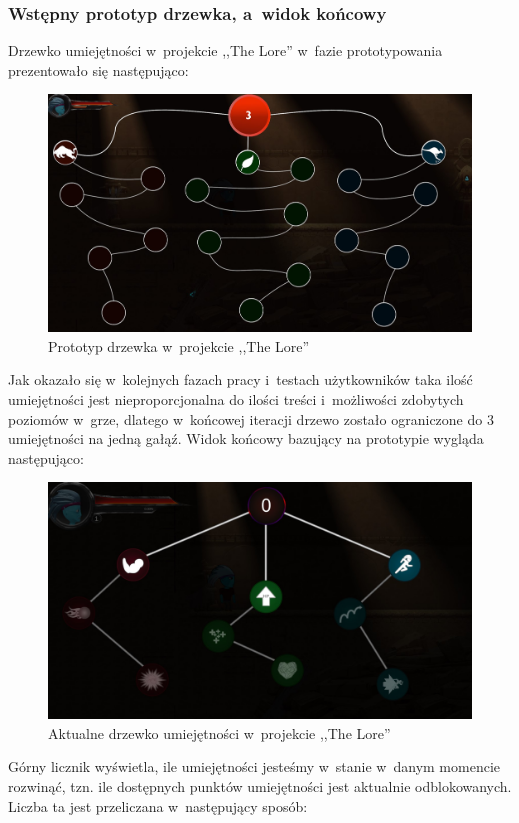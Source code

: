 \documentclass[oneside,polski,logo]{amuthesis}
\begin{document}
\subsubsection{Wstępny prototyp drzewka, a~widok końcowy}
Drzewko umiejętności w~projekcie ,,The Lore'' w~fazie prototypowania prezentowało się następująco:


\begin{figure}[h]
	\centering
	\includegraphics[width=13cm]{images/kozubal/drzewkoPrototyp.jpg}
	\caption{Prototyp drzewka w~projekcie ,,The Lore''}
\end{figure}

Jak okazało się w~kolejnych fazach pracy i~testach użytkowników taka ilość umiejętności jest nieproporcjonalna do ilości treści i~możliwości zdobytych poziomów w~grze, dlatego w~końcowej iteracji drzewo zostało ograniczone do 3 umiejętności na jedną gałąź. Widok końcowy bazujący na prototypie wygląda następująco:


\begin{figure}[h]
	\centering
	\includegraphics[width=13cm]{images/kozubal/drzewkoTheLore.jpg}
	\caption{Aktualne drzewko umiejętności w~projekcie ,,The Lore''}
\end{figure}
\newpage
Górny licznik wyświetla, ile umiejętności jesteśmy w~stanie w~danym momencie rozwinąć, tzn. ile dostępnych punktów umiejętności jest aktualnie odblokowanych. Liczba ta jest przeliczana w~następujący sposób:
\end{document}
